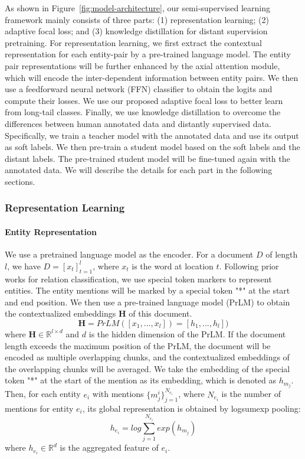 \documentclass[11pt]{article}
\begin{document}
As shown in Figure~\ref{fig:model-architecture}, our semi-supervised learning framework mainly consists of three parts: (1) representation learning; (2) adaptive focal loss; and (3) knowledge distillation for distant supervision pretraining. For representation learning, we first extract the contextual representation for each entity-pair by a pre-trained language model. The entity pair representations will be further enhanced by the axial attention module, which will encode the inter-dependent information between entity pairs. We then use a feedforward neural network (FFN) classifier to obtain the logits and compute their losses. We use our proposed adaptive focal loss to better learn from long-tail classes. Finally, we use knowledge distillation to overcome the differences between human annotated data and distantly supervised data. Specifically, we train a teacher model with the annotated data and use its output as soft labels. We then pre-train a student model based on the soft labels and the distant labels. The pre-trained student model will be fine-tuned again with the annotated data. We will describe the details for each part in the following sections.



\subsubsection{Representation Learning}
\paragraph{Entity Representation} We use a pretrained language model as the encoder. For a document $D$ of length $l$, we have $D = [x_{t}]_{t=1}^{l}$, where $x_{t}$ is the word at location $t$. Following prior works for relation classification, we use special token markers to represent entities. The entity mentions will be marked by a special token "*" at the start and end position. We then use a pre-trained language model (PrLM) to obtain the contextualized embeddings $\mathbf{H}$ of this document. 
\begin{equation}
    \mathbf{H} = PrLM([x_1,...,x_l]) = [h_1,...,h_l])
\end{equation}
where $\mathbf{H} \in \mathbb{R}^{{l}\times{d}}$ and $d$ is the hidden dimension of the PrLM. If the document length exceeds the maximum position of the PrLM, the document will be encoded as multiple overlapping chunks, and the contextualized embeddings of the overlapping chunks will be averaged. We take the embedding of the special token "*" at the start of the mention as its embedding, which is denoted as $h_{m_{j}}$. Then, for each entity $e_{i}$ with mentions $\{m_j^{i}\}^{N_{e_i}}_{j=1}$, where $N_{e_{i}}$ is the number of mentions for entity $e_{i}$, its global representation is obtained by logsumexp pooling:
\begin{equation}
    h_{e_{i}} = log\sum^{N_{e_{i}}}_{j=1}exp(h_{m_{j}})
\end{equation}
where $h_{e_{i}} \in \mathbb{R}^{d}$ is the aggregated feature of $e_{i}$.
\end{document}
